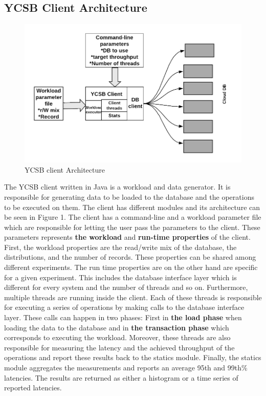 \documentclass[sigconf,10pt]{acmart}
\begin{document}
\subsection{ YCSB Client Architecture}
\begin{figure}[h!]
  \includegraphics[width=\linewidth]{client.png}
  \caption{YCSB client Architecture}
  \label{fig:boat1}
\end{figure}
The YCSB client written in Java is a workload and data generator. It is responsible for generating data to be loaded to the database and the operations to be executed on them.
The client has different modules and its architecture can be seen in Figure 1.
The client has a command-line and a workload parameter file which are responsible for letting the user pass the parameters to the client. These parameters represents
\textbf{the workload } and \textbf{run-time properties} of the client. First, the workload properties are the read/write mix of the database, the distributions, and the number of records.  These properties can be shared among different experiments.
The run time properties are on the other hand are specific for a given experiment. This includes the database interface layer which is different for every system and the number of threads and so on.\newline
Furthermore, multiple threads are running inside the client. Each of these threads is responsible for executing a series of operations by making calls to the database interface layer. These calls can happen in two phases: First in \textbf{the load phase} when loading the data to the database and in \textbf{the transaction phase}  which corresponds to executing the workload. Moreover, these threads are also responsible for measuring the latency and the achieved throughput of the operations and report these results back to the statics module. Finally, the statics module aggregates the measurements and reports an average 95th and 99th\% latencies. The results are returned as either a histogram or a time series of reported latencies.
\end{document}

